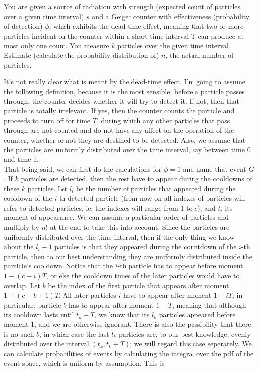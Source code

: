 \documentclass{../note}
\begin{document}
\begin{exercise}{6.5}
You are given a source of radiation with strength (expected count of particles over a given time interval) $s$ and a Geiger counter with effectiveness (probability of detection) $\phi$, which exhibits the dead-time effect, meaning that two or more particles incident on the counter within a short time interval T can produce at most only one count. You measure $k$ particles over the given time interval. Estimate (calculate the probability distribution of) $n$, the actual number of particles.
\end{exercise}

\begin{solution}
It's not really clear what is meant by the dead-time effect. I'm going to assume the following definition, because it is the most sensible: before a particle passes through, the counter decides whether it will try to detect it. If not, then that particle is totally irrelevant. If yes, then the counter counts the particle and proceeds to turn off for time $T$, during which any other particles that pass through are not counted and do not have any affect on the operation of the counter, whether or not they are destined to be detected. Also, we assume that the particles are uniformly distributed over the time interval, say between time 0 and time 1.\\
That being said, we can first do the calculations for $\phi = 1$ and name that event $G$. If $k$ particles are detected, then the rest have to appear during the cooldowns of these $k$ particles. Let $l_i$ be the number of particles that appeared during the cooldown of the $i$-th detected particle (from now on all indexes of particles will refer to detected particles, ie. the indexes will range from $1$ to $c$), and $t_i$ its moment of appearance. We can assume a particular order of particles and multiply by $n!$ at the end to take this into account. Since the particles are uniformly distributed over the time interval, then if the only thing we know about the $l_i - 1$ particles is that they appeared during the countdown of the $i$-th particle, then to our best understanding they are uniformly distributed inside the particle's cooldown. Notice that the $i$-th particle has to appear before moment $1 - (c - i)T$, or else the cooldown times of the later particles would have to overlap. Let $b$ be the index of the first particle that appears after moment $1 - (c - b + 1)T$. All later particles $i$ have to appear after moment $1 - iT$; in particular, particle $k$ has to appear after moment $1 - T$, meaning that although its cooldown lasts until $t_k + T$, we know that its $l_k$ particles appeared before moment 1, and we are otherwise ignorant. There is also the possibility that there is no such $b$, in which case the last $l_k$ particles are, to our best knowledge, evenly distributed over the interval $(t_k, t_k + T)$; we will regard this case seperately. We can calculate probabilities of events by calculating the integral over the pdf of the event space, which is uniform by assumption. This is


\end{solution}
\end{document}
